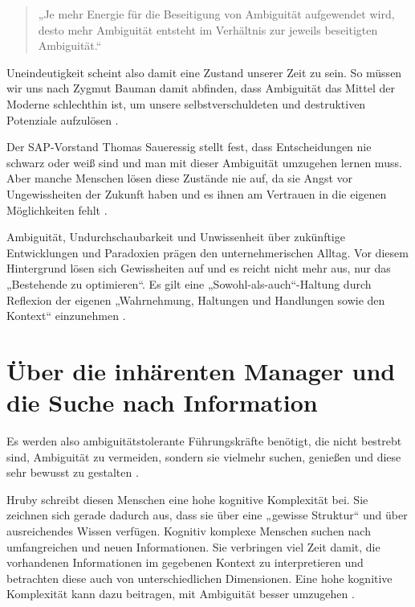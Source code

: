 \documentclass[
  ngerman,
  letterpaper,
  DIV=11]{scrartcl}
\begin{document}
\begin{quote}
„Je mehr Energie für die Beseitigung von Ambiguität aufgewendet wird,
desto mehr Ambiguität entsteht im Verhältnis zur jeweils beseitigten
Ambiguität.`` \autocite[76]{bauer2018}
\end{quote}

Uneindeutigkeit scheint also damit eine Zustand unserer Zeit zu sein. So
müssen wir uns nach Zygmut Bauman damit abfinden, dass Ambiguität das
Mittel der Moderne schlechthin ist, um unsere selbstverschuldeten und
destruktiven Potenziale aufzulösen \autocite{bauman2016}.

Der SAP-Vorstand Thomas Saueressig stellt fest, dass Entscheidungen nie
schwarz oder weiß sind und man mit dieser Ambiguität umzugehen lernen
muss. \autocite{witte2024} Aber manche Menschen lösen diese Zustände nie
auf, da sie Angst vor Ungewissheiten der Zukunft haben und es ihnen am
Vertrauen in die eigenen Möglichkeiten fehlt
\autocite[15]{morschitzky2009}.

Ambiguität, Undurchschaubarkeit und Unwissenheit über zukünftige
Entwicklungen und Paradoxien prägen den unternehmerischen Alltag. Vor
diesem Hintergrund lösen sich Gewissheiten auf und es reicht nicht mehr
aus, nur das „Bestehende zu optimieren``. Es gilt eine
„Sowohl-als-auch``-Haltung durch Reflexion der eigenen „Wahrnehmung,
Haltungen und Handlungen sowie den Kontext`` einzunehmen
\autocite{kozica2025}.

\section{Über die inhärenten Manager und die Suche nach
Information}\label{uxfcber-die-inhuxe4renten-manager-und-die-suche-nach-information}

Es werden also ambiguitätstolerante Führungskräfte benötigt, die nicht
bestrebt sind, Ambiguität zu vermeiden, sondern sie vielmehr suchen,
genießen und diese sehr bewusst zu gestalten \autocite[90]{bauer2018}.

Hruby schreibt diesen Menschen eine hohe kognitive Komplexität bei. Sie
zeichnen sich gerade dadurch aus, dass sie über eine „gewisse Struktur``
und über ausreichendes Wissen verfügen. Kognitiv komplexe Menschen
suchen nach umfangreichen und neuen Informationen. Sie verbringen viel
Zeit damit, die vorhandenen Informationen im gegebenen Kontext zu
interpretieren und betrachten diese auch von unterschiedlichen
Dimensionen. Eine hohe kognitive Komplexität kann dazu beitragen, mit
Ambiguität besser umzugehen \autocite[5]{hruby2014}.
\end{document}
